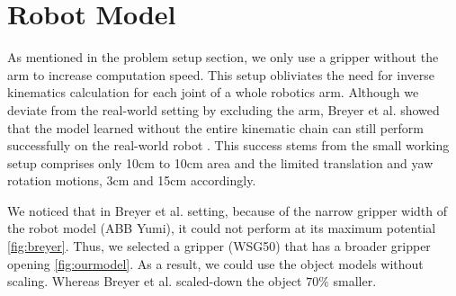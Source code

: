 \section{Robot Model}
As mentioned in the problem setup section, we only use a gripper without the arm to increase computation speed. This setup obliviates the need for inverse kinematics calculation for each joint of a whole robotics arm. Although we deviate from the real-world setting by excluding the arm, Breyer et al. showed that the model learned without the entire kinematic chain can still perform successfully on the real-world robot \cite{Breyer2018}. This success stems from the small working setup comprises only 10cm to 10cm area and the limited translation and yaw rotation motions, 3cm and 15cm accordingly.

We noticed that in Breyer et al. setting, because of the narrow gripper width of the robot model (ABB Yumi), it could not perform at its maximum potential \ref{fig:breyer}. Thus, we selected a gripper (WSG50) that has a broader gripper opening \ref{fig:ourmodel}. As a result, we could use the object models without scaling. Whereas Breyer et al. scaled-down the object \(70\%\) smaller.


